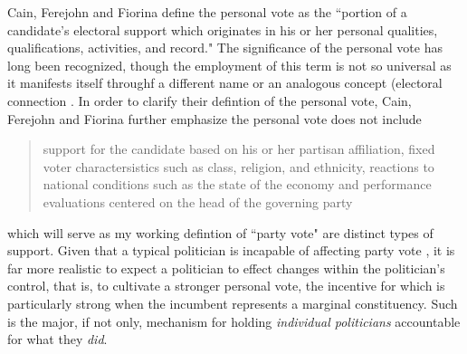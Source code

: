 \documentclass{article}
\begin{document}
			Cain, Ferejohn and Fiorina
			\autocite*{cainPersonalVoteConstituency1987}
			define the personal vote as the ``portion of a candidate's electoral support which originates in his or her
			personal qualities,
			qualifications,
			activities,
			and record." 
			\autocite*[9]{cainPersonalVoteConstituency1987}
			The significance of the personal vote has long been recognized,
			though the employment of this term is not so universal as it manifests itself throughf a different name or an analogous concept
			(electoral connection
			\autocites[home style][]
			{fennoHomeStyleHouse1978}
			[electoral connection][]
			{mayhewCongressElectoralConnection1974}
			[personal reputation][]
			{careyIncentivesCultivatePersonal1995}
			[local vote][]
			{pattieWinningLocalVote1995}.
			In order to clarify their defintion of the personal vote,
			Cain, Ferejohn and Fiorina
			\autocite*[9]{cainPersonalVoteConstituency1987}
			further emphasize the personal vote does not include
			\begin{quotation}
				support for the candidate based on his or her partisan affiliation,
				fixed voter charactersistics such as class, religion, and ethnicity,
				reactions to national conditions such as the state of the economy and performance evaluations centered on the head of the governing party
			\end{quotation}
			which will serve as my working defintion of ``party vote" are distinct types of support.
			Given that a typical politician
			is incapable of affecting party vote
			\autocite{mayhewCongressElectoralConnection1974},
			it is far more realistic to expect
			a politician to effect changes within the politician's control,
			that is,
			to cultivate a stronger personal vote,
			the incentive for which is particularly strong when
			the incumbent represents a marginal constituency.
			Such is the major,
			if not only,
			mechanism for holding \textit{individual politicians} accountable for what they \textit{did}.
			
\end{document}
